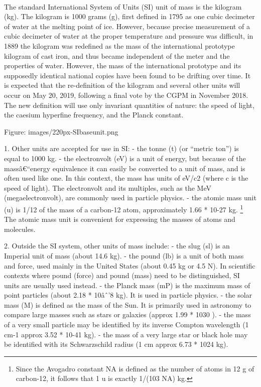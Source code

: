 \documentclass{book}
\begin{document}
    \paragraph{}
    The standard International System of Units (SI) unit of mass is the kilogram (kg). The kilogram is 1000 grams (g), first defined in 1795 as one cubic decimeter of water at the melting point of ice. However, because precise measurement of a cubic decimeter of water at the proper temperature and pressure was difficult, in 1889 the kilogram was redefined as the mass of the international prototype kilogram of cast iron, and thus became independent of the meter and the properties of water. However, the mass of the international prototype and its supposedly identical national copies have been found to be drifting over time. It is expected that the re-definition of the kilogram and several other units will occur on May 20, 2019, following a final vote by the CGPM in November 2018. The new definition will use only invariant quantities of nature: the speed of light, the caesium hyperfine frequency, and the Planck constant.
    
    Figure: images/220px-SIbaseunit.png
    
        1. Other units are accepted for use in SI:
            - the tonne (t) (or ``metric ton'') is equal to 1000 kg.
            - the electronvolt (eV) is a unit of energy, but because of the massâ€“energy equivalence it can easily be converted to a unit of mass, and is often used like one. In this context, the mass has units of eV/c2 (where c is the speed of light). The electronvolt and its multiples, such as the MeV (megaelectronvolt), are commonly used in particle physics.
            - the atomic mass unit (u) is 1/12 of the mass of a carbon-12 atom, approximately 1.66 * 10{-27} kg. \footnote{Since the Avogadro constant NA is defined as the number of atoms in 12 g of carbon-12, it follows that 1 u is exactly 1/(103 NA) kg.} The atomic mass unit is convenient for expressing the masses of atoms and molecules.        
        
        2. Outside the SI system, other units of mass include:
            - the slug (sl) is an Imperial unit of mass (about 14.6 kg).
            - the pound (lb) is a unit of both mass and force, used mainly in the United States (about 0.45 kg or 4.5 N). In scientific contexts where pound (force) and pound (mass) need to be distinguished, SI units are usually used instead.
            - the Planck mass (mP) is the maximum mass of point particles (about 2.18 * 10{âˆ’8} kg). It is used in particle physics.
            - the solar mass (M) is defined as the mass of the Sun. It is primarily used in astronomy to compare large masses such as stars or galaxies (approx 1.99 * 10{30} ).
            - the mass of a very small particle may be identified by its inverse Compton wavelength (1 cm{-1} approx 3.52 * 10{-41} kg).
            - the mass of a very large star or black hole may be identified with its Schwarzschild radius (1 cm approx 6.73 * 10{24} kg).
            
\end{document}
